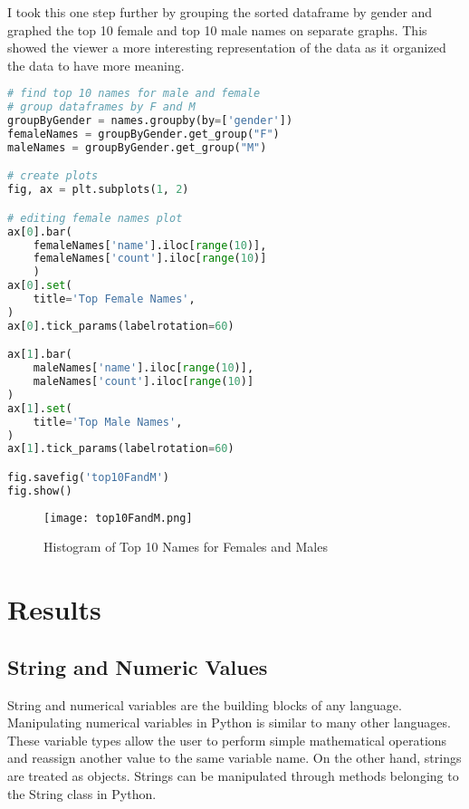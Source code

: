 \documentclass[journal]{IEEEtran}
\begin{document}
I took this one step further by grouping the sorted dataframe by gender and graphed the top 10 female and top 10 male names on separate graphs. This showed the viewer a more interesting representation of the data as it organized the data to have more meaning. 
\begin{lstlisting}[language=Python, caption={Splitting Dataframe by Gender and Graphing Top 10 Names Histogram for each Gender}]
# find top 10 names for male and female 
# group dataframes by F and M 
groupByGender = names.groupby(by=['gender'])
femaleNames = groupByGender.get_group("F")
maleNames = groupByGender.get_group("M")

# create plots 
fig, ax = plt.subplots(1, 2)

# editing female names plot
ax[0].bar(
    femaleNames['name'].iloc[range(10)], 
    femaleNames['count'].iloc[range(10)]
    )
ax[0].set(
    title='Top Female Names',
)
ax[0].tick_params(labelrotation=60)

ax[1].bar(
    maleNames['name'].iloc[range(10)], 
    maleNames['count'].iloc[range(10)]
)
ax[1].set(
    title='Top Male Names', 
)
ax[1].tick_params(labelrotation=60)

fig.savefig('top10FandM')
fig.show()
\end{lstlisting}
\begin{figure}[h!]
\texttt{[image: top10FandM.png]}
\centering
\caption{Histogram of Top 10 Names for Females and Males}
\end{figure}

\section{Results}

\subsection{String and Numeric Values}
String and numerical variables are the building blocks of any language. Manipulating numerical variables in Python is similar to many other languages. These variable types allow the user to perform simple mathematical operations and reassign another value to the same variable name. On the other hand, strings are treated as objects. Strings can be manipulated through methods belonging to the String class in Python.
\end{document}
